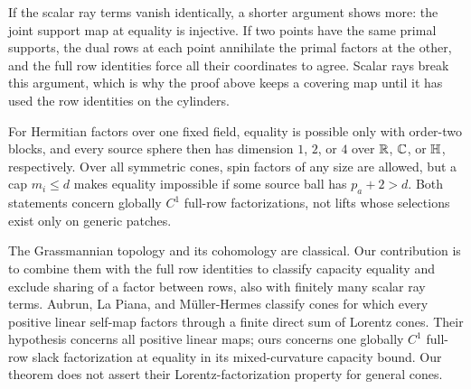 If the scalar ray terms vanish identically, a shorter argument shows
more: the joint support map at equality is injective. If two points
have the same primal supports, the dual rows at each point annihilate
the primal factors at the other, and the full row identities force all
their coordinates to agree. Scalar rays break this argument, which is
why the proof above keeps a covering map until it has used the row
identities on the cylinders.

For Hermitian factors over one fixed field, equality is possible only
with order-two blocks, and every source sphere then has dimension $1$,
$2$, or $4$ over $\mathbb R$, $\mathbb C$, or $\mathbb H$, respectively. Over all symmetric cones, spin factors of
any size are allowed, but a cap $m_i\leq d$ makes equality impossible if
some source ball has $p_a+2>d$. Both statements concern globally $C^1$
full-row factorizations, not lifts whose selections exist only on
generic patches.

The Grassmannian topology and its cohomology are classical. Our
contribution is to combine them with the full row identities to classify
capacity equality and exclude sharing of a factor between rows, also
with finitely many scalar ray terms.
Aubrun, La Piana, and M\"uller-Hermes
\cite[Theorem~1]{ALM2026Lorentz} classify cones for which every positive
linear self-map factors through a finite direct sum of Lorentz cones.
Their hypothesis concerns all positive linear maps; ours concerns
one globally $C^1$ full-row slack factorization at equality in its
mixed-curvature capacity bound. Our theorem does not assert their
Lorentz-factorization property for general cones.
